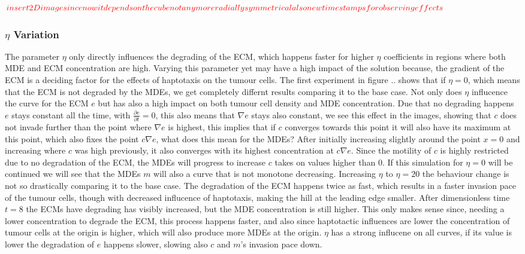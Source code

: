 $\textcolor{red}{insert 2D image since now it depends on the cube not anymore radially symmetrical also new time stamps for observing effects}$

\subsubsection*{$\eta$ Variation}
The parameter $\eta$ only directly influences the degrading of the ECM, which happens faster for higher $\eta$ coefficients in regions where both MDE and ECM concentration are high. Varying this parameter yet may have a high impact of the solution because, the gradient of the ECM is a deciding factor for the effects of haptotaxis on the tumour cells. \newline
The first experiment in figure .. shows that if $\eta = 0$, which means that the ECM is not degraded by the MDEs, we get completely differnt results comparing it to the base case. Not only does $\eta$ influcence the curve for the ECM $e$ but has also a high impact on both tumour cell density and MDE concentration. Due that no degrading happens $e$ stays constant all the time, with $\frac{\partial e}{\partial t} = 0$, this also means that $\nabla e$ stays also constant, we see this effect in the images, showing that $c$ does not invade further than the point where $\nabla e$ is highest, this implies that if $c$ converges towards this point it will also have its maximum at this point, which also fixes the point $c\nabla e$, what does this mean for the MDEs? After initially increasing slightly around the point $x=0$ and increasing where $c$ was high previously, it also converges with its highest concentration at $c\nabla e$. Since the motility of $c$ is highly restricted due to no degradation of the ECM, the MDEs will progress to increase $c$ takes on values higher than 0. If this simulation for $\eta=0$ will be continued we will see that the MDEs $m$ will also a curve that is not monotone decreasing.
Increasing $\eta$ to $\eta=20$ the behaviour change is not so drastically comparing it to the base case. The degradation of the ECM happens twice as fast, which results in a faster invasion pace of the tumour cells, though with decreased influcence of haptotaxis, making the hill at the leading edge smaller. After dimensionless time $t=8$ the ECMs have degrading has visibly increased, but the MDE concentration is still higher. This only makes sense since, needing a lower concentration to degrade the ECM, this process happens faster, and also since haptotactic influences are lower the concentration of tumour cells at the origin is higher, which will also produce more MDEs at the origin. 
$\eta$ has a strong influcene on all curves, if its value is lower the degradation of $e$ happens slower, slowing also $c$ and $m$'s invasion pace down. 

